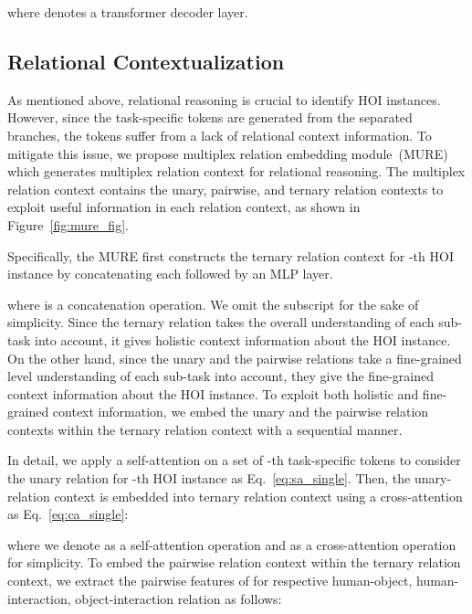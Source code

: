 \documentclass[10pt,twocolumn,letterpaper]{article}
\begin{document}
where  denotes a transformer decoder layer.













\subsection{Relational Contextualization}


As mentioned above, relational reasoning is crucial to identify HOI instances.
However, since the task-specific tokens are generated from the separated branches, the tokens suffer from a lack of relational context information.
To mitigate this issue, we propose multiplex relation embedding module~(MURE) which generates multiplex relation context for relational reasoning.
The multiplex relation context contains the unary, pairwise, and ternary relation contexts to exploit useful information in each relation context, as shown in Figure~\ref{fig:mure_fig}.


Specifically, the MURE first constructs the ternary relation context  for -th HOI instance by concatenating each  followed by an MLP layer.

where  is a concatenation operation.
We omit the subscript  for the sake of simplicity.
Since the ternary relation takes the overall understanding of each sub-task into account, it gives holistic context information about the HOI instance.
On the other hand, since the unary and the pairwise relations take a fine-grained level understanding of each sub-task into account, they give the fine-grained context information about the HOI instance.
To exploit both holistic and fine-grained context information, we embed the unary and the pairwise relation contexts within the ternary relation context with a sequential manner.



In detail, we apply a self-attention on a set of -th task-specific tokens  to consider the unary relation for -th HOI instance as Eq.~\ref{eq:sa_single}.
Then, the unary-relation context  is embedded into ternary relation context using a cross-attention as Eq.~\ref{eq:ca_single}:

where we denote  as a self-attention operation and  as a cross-attention operation for simplicity.
To embed the pairwise relation context within the ternary relation context, we extract the pairwise features of  for respective human-object, human-interaction, object-interaction relation as follows:
\end{document}
